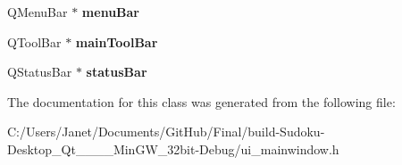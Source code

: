 \begin{DoxyCompactItemize}
\item 
\hypertarget{class_ui___main_window_a2be1c24ec9adfca18e1dcc951931457f}{Q\-Menu\-Bar $\ast$ {\bfseries menu\-Bar}}\label{class_ui___main_window_a2be1c24ec9adfca18e1dcc951931457f}

\item 
\hypertarget{class_ui___main_window_a5172877001c8c7b4e0f6de50421867d1}{Q\-Tool\-Bar $\ast$ {\bfseries main\-Tool\-Bar}}\label{class_ui___main_window_a5172877001c8c7b4e0f6de50421867d1}

\item 
\hypertarget{class_ui___main_window_a50fa481337604bcc8bf68de18ab16ecd}{Q\-Status\-Bar $\ast$ {\bfseries status\-Bar}}\label{class_ui___main_window_a50fa481337604bcc8bf68de18ab16ecd}

\end{DoxyCompactItemize}


The documentation for this class was generated from the following file\-:\begin{DoxyCompactItemize}
\item 
C\-:/\-Users/\-Janet/\-Documents/\-Git\-Hub/\-Final/build-\/\-Sudoku-\/\-Desktop\-\_\-\-Qt\-\_\-\_\-\_\-\_\-\-Min\-G\-W\-\_\-32bit-\/\-Debug/ui\-\_\-mainwindow.\-h\end{DoxyCompactItemize}
